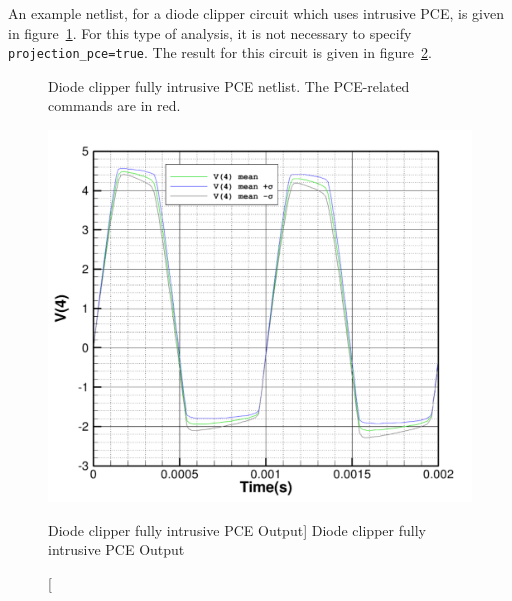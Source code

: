 An example netlist, for a diode clipper circuit which uses intrusive PCE, is given in figure~\ref{Fully_Intrusive_PCE_netlist1}.
For this type of analysis, it is not necessary to specify \texttt{projection\_pce=true}.  The result for this circuit 
is given in figure~\ref{Fully_Intrusive_PCE_result1}.  
\begin{figure}[htbp]
\fontsize{9pt}{10pt}
\begin{centering}
\caption{Diode clipper fully intrusive PCE netlist.
 The PCE-related commands are in \color{red}red\color{black}.
\label{Fully_Intrusive_PCE_netlist1}}
\end{centering}
\end{figure}

\begin{figure}[hbt]
\centering
\includegraphics[width=5in]{clipperPce2.pdf}
\caption
  [Diode clipper fully intrusive PCE Output] {Diode clipper fully intrusive PCE Output}
\label{Fully_Intrusive_PCE_result1}
\end{figure}


